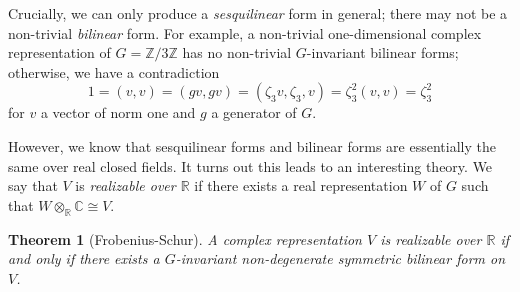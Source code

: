 \documentclass[12pt]{article}
\theoremstyle{plain}
\newtheorem{theorem}{Theorem}[section]
\theoremstyle{definition}
\theoremstyle{remark}
\numberwithin{equation}{section}
\begin{document}
Crucially, we can only produce a \emph{sesquilinear} form in general;
there may not be a non-trivial \emph{bilinear} form.
For example, a non-trivial one-dimensional complex representation of
$G=\mathbb{Z}/3\mathbb{Z}$ has no non-trivial $G$-invariant bilinear forms;
otherwise, we have a contradiction
\[
1=(v,v)=(gv,gv)=(\zeta_3v,\zeta_3,v)=\zeta_3^2(v,v)=\zeta_3^2
\]
for $v$ a vector of norm one and $g$ a generator of $G$.

However, we know that sesquilinear forms and bilinear forms are
essentially the same over real closed fields.
It turns out this leads to an interesting theory. 
We say that $V$ is \emph{realizable over $\mathbb{R}$} if there exists a
real representation $W$ of $G$ such that $W \otimes_\mathbb{R}
\mathbb{C} \cong V$.

\begin{theorem}[Frobenius-Schur] \label{thm:FrobSchur}
A complex representation $V$ is realizable over $\mathbb{R}$ if and only
if there exists a $G$-invariant non-degenerate symmetric bilinear form
on $V$.
\end{theorem}
\end{document}
